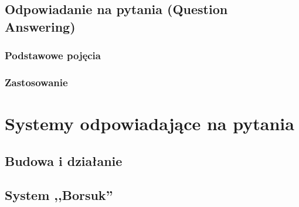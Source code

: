 \documentclass[a4paper, twoside, 12pt]{report}
\begin{document}
    \section{Odpowiadanie na pytania (Question Answering)}
        \subsection{Podstawowe pojęcia}
        \subsection{Zastosowanie}
\chapter{Systemy odpowiadające na pytania}
    \section{Budowa i działanie}
    \section{System ,,Borsuk''}

\clearpage
{}


\end{document}
